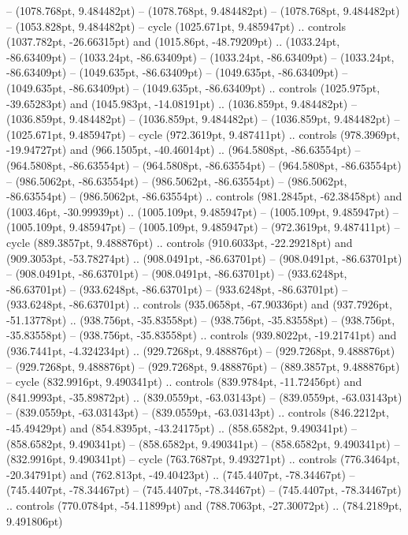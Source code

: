  -- (1078.768pt, 9.484482pt)
 -- (1078.768pt, 9.484482pt)
 -- (1078.768pt, 9.484482pt)
 -- (1053.828pt, 9.484482pt) -- cycle
(1025.671pt, 9.485947pt) .. controls (1037.782pt, -26.66315pt) and (1015.86pt, -48.79209pt) .. (1033.24pt, -86.63409pt)
 -- (1033.24pt, -86.63409pt)
 -- (1033.24pt, -86.63409pt)
 -- (1033.24pt, -86.63409pt)
 -- (1049.635pt, -86.63409pt)
 -- (1049.635pt, -86.63409pt)
 -- (1049.635pt, -86.63409pt)
 -- (1049.635pt, -86.63409pt) .. controls (1025.975pt, -39.65283pt) and (1045.983pt, -14.08191pt) .. (1036.859pt, 9.484482pt)
 -- (1036.859pt, 9.484482pt)
 -- (1036.859pt, 9.484482pt)
 -- (1036.859pt, 9.484482pt)
 -- (1025.671pt, 9.485947pt) -- cycle
(972.3619pt, 9.487411pt) .. controls (978.3969pt, -19.94727pt) and (966.1505pt, -40.46014pt) .. (964.5808pt, -86.63554pt)
 -- (964.5808pt, -86.63554pt)
 -- (964.5808pt, -86.63554pt)
 -- (964.5808pt, -86.63554pt)
 -- (986.5062pt, -86.63554pt)
 -- (986.5062pt, -86.63554pt)
 -- (986.5062pt, -86.63554pt)
 -- (986.5062pt, -86.63554pt) .. controls (981.2845pt, -62.38458pt) and (1003.46pt, -30.99939pt) .. (1005.109pt, 9.485947pt)
 -- (1005.109pt, 9.485947pt)
 -- (1005.109pt, 9.485947pt)
 -- (1005.109pt, 9.485947pt)
 -- (972.3619pt, 9.487411pt) -- cycle
(889.3857pt, 9.488876pt) .. controls (910.6033pt, -22.29218pt) and (909.3053pt, -53.78274pt) .. (908.0491pt, -86.63701pt)
 -- (908.0491pt, -86.63701pt)
 -- (908.0491pt, -86.63701pt)
 -- (908.0491pt, -86.63701pt)
 -- (933.6248pt, -86.63701pt)
 -- (933.6248pt, -86.63701pt)
 -- (933.6248pt, -86.63701pt)
 -- (933.6248pt, -86.63701pt) .. controls (935.0658pt, -67.90336pt) and (937.7926pt, -51.13778pt) .. (938.756pt, -35.83558pt)
 -- (938.756pt, -35.83558pt)
 -- (938.756pt, -35.83558pt)
 -- (938.756pt, -35.83558pt) .. controls (939.8022pt, -19.21741pt) and (936.7441pt, -4.324234pt) .. (929.7268pt, 9.488876pt)
 -- (929.7268pt, 9.488876pt)
 -- (929.7268pt, 9.488876pt)
 -- (929.7268pt, 9.488876pt)
 -- (889.3857pt, 9.488876pt) -- cycle
(832.9916pt, 9.490341pt) .. controls (839.9784pt, -11.72456pt) and (841.9993pt, -35.89872pt) .. (839.0559pt, -63.03143pt)
 -- (839.0559pt, -63.03143pt)
 -- (839.0559pt, -63.03143pt)
 -- (839.0559pt, -63.03143pt) .. controls (846.2212pt, -45.49429pt) and (854.8395pt, -43.24175pt) .. (858.6582pt, 9.490341pt)
 -- (858.6582pt, 9.490341pt)
 -- (858.6582pt, 9.490341pt)
 -- (858.6582pt, 9.490341pt)
 -- (832.9916pt, 9.490341pt) -- cycle
(763.7687pt, 9.493271pt) .. controls (776.3464pt, -20.34791pt) and (762.813pt, -49.40423pt) .. (745.4407pt, -78.34467pt)
 -- (745.4407pt, -78.34467pt)
 -- (745.4407pt, -78.34467pt)
 -- (745.4407pt, -78.34467pt) .. controls (770.0784pt, -54.11899pt) and (788.7063pt, -27.30072pt) .. (784.2189pt, 9.491806pt)
